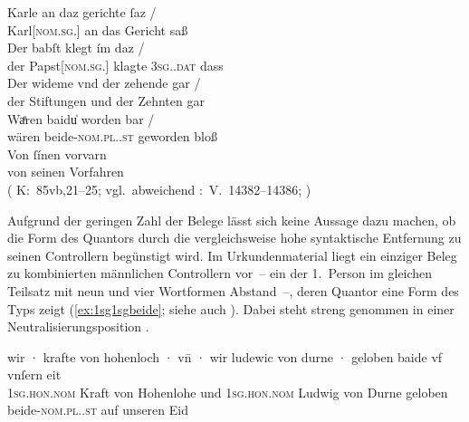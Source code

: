 \begin{exe}
\ex \label{ex:baideuwarn3}
	\gll Karle an daz gerichte ſaz {/} \\
	    Karl[\textsc{nom.sg.\MascM}] an das Gericht saß \\
	\gll Der babſt klegt ím daz {/} \\
		der Papst[\textsc{nom.sg.\MascM}] klagte \textsc{3sg.\MascM.dat} dass \\
	\gll Der wideme vnd der zehende gar {/} \\
		der Stiftungen und der Zehnten gar \\
	\gll Waͤren baidu̍ worden bar {/} \\
		wären beide-\textsc{nom.pl.\NeutM.st} geworden bloß \\
	\gll Von ſínen vorvarn \\
		von seinen Vorfahren \\
	\trans {}
		(%
			K:~85vb,21--25; vgl.~abweichend
			\KC:~V.~14382--14386;
			\cite[341]{schroeder1895}%
		)
\end{exe}

Aufgrund der geringen Zahl der Belege lässt sich keine Aussage dazu machen, ob
die Form des Quantors durch die vergleichsweise hohe syntaktische Entfernung zu
seinen Controllern begünstigt wird. Im Urkundenmaterial liegt ein einziger
Beleg zu kombinierten männlichen Controllern vor~-- ein 
der 1.~Person im gleichen Teilsatz mit neun und vier Wortformen
Abstand~--, deren Quantor eine Form des Typs 
zeigt (\ref{ex:1sg1sgbeide}; siehe auch ). Dabei steht
 streng genommen in einer Neutralisierungsposition
\autocites[vgl.][90--91]{askedal1973}[191]{gjelsten1980}.

\begin{exe}
\ex\label{ex:1sg1sgbeide}
	\gll wir · krafte von hohenloch · vn̄ · wir
		ludewic von durne · geloben baide vf vnſern eit \\
		\textsc{1sg\subM.hon.nom} {} Kraft von Hohenlohe {} und {}
		\textsc{1sg\subM.hon.nom} Ludwig von Durne {} geloben
		beide-\textsc{nom.pl.\MascM.st} auf unseren Eid \\
	\trans {}
		\parencites(Nr.~2529, Burg Hohlach, Kr.~Neustadt an der Aisch-Bad Windsheim, 1296)[563,5--6]{cao3}%
\end{exe}

